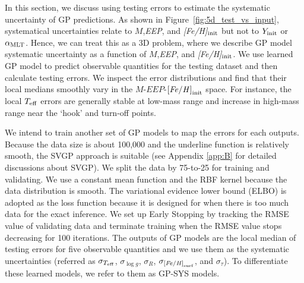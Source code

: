 In this section, we discuss using testing errors to estimate the systematic uncertainty of GP predictions. As shown in Figure~\ref{fig:5d_test_vs_input}, systematical uncertainties relate to $M$,{\it EEP}, and {\it [Fe/H]}$_{\rm init}$ but not to $Y_{\rm init}$ or $\alpha_{\rm MLT}$.  Hence, we can treat this as a 3D problem, where we describe GP model systematic uncertainty as a function of $M$,{\it EEP}, and {\it [Fe/H]}$_{\rm init}$. 
%
We use learned GP model to predict observable quantities for the testing dataset and then calculate testing errors. We inspect the error distributions and find that their local medians smoothly vary in the $M$-$EEP$-$\rm {\it [Fe/H]}_{init}$ space. For instance, the local $T_{\rm eff}$ errors are generally stable at low-mass range and increase in high-mass range near the `hook' and turn-off points. 

We intend to train another set of GP models to map the errors for each outputs. Because the data size is about 100,000 and the underline function is relatively smooth, the SVGP approach is suitable (see Appendix \ref{app:B} for detailed discussions about SVGP). We split the data by 75-to-25 for training and validating. We use a constant mean function and the RBF kernel because the data distribution is smooth. The variational evidence lower bound (ELBO) is adopted as the loss function because it is designed for when there is too much data for the exact inference. We set up Early Stopping by tracking the RMSE value of validating data and terminate training when the RMSE value stops decreasing for 100 iterations. The outputs of GP models are the local median of testing errors for five observable quantities and we use them as the systematic uncertainties (referred as $\sigma_{T_{\rm eff}}$, $\sigma_{\log g}$, $\sigma_{R}$, $\sigma_{\rm {\it [Fe/H]}_{\rm surf}}$, and $\sigma_{\tau}$). To differentiate these learned models, we refer to them as GP-SYS models.


